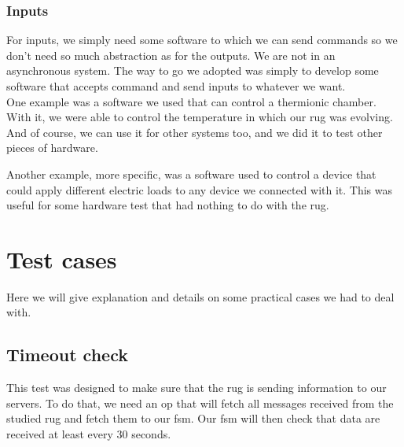 \documentclass[12pt]{article}
\theoremstyle{definition}
\theoremstyle{definition}
\theoremstyle{remark}
\begin{document}
\subsubsection{Inputs}

For inputs, we simply need some software to which we can send commands so we don't need so much abstraction as for the outputs. We are not in an asynchronous system. The way to go we adopted was simply to develop some software that accepts command and send inputs to whatever we want.\\

One example was a software we used that can control a thermionic chamber. With it, we were able to control the temperature in which our \gls{rug} was evolving. And of course, we can use it for other systems too, and we did it to test other pieces of hardware.

Another example, more specific, was a software used to control a device that could apply different electric loads to any device we connected with it. This was useful for some hardware test that had nothing to do with the \gls{rug}.



\clearpage
\section{Test cases}
\label{sec:testcases}

Here we will give explanation and details on some practical cases we had to deal with.


\subsection{Timeout check}

This test was designed to make sure that the \gls{rug} is sending information to our servers. To do that, we need an \gls{op} that will fetch all messages received from the studied \gls{rug} and fetch them to our \gls{fsm}. Our \gls{fsm} will then check that data are received at least every 30 seconds.\\
\end{document}
